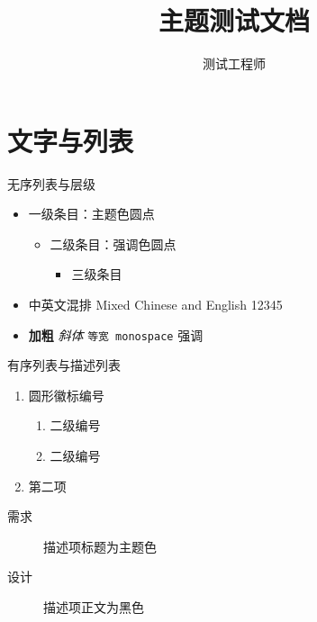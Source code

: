 \usepackage{amsmath}
\usepackage{amssymb}
\usepackage{booktabs}
\usepackage{tabularx}
\usepackage{colortbl}
\usepackage[export]{adjustbox}
\usepackage{fontawesome5}
\usepackage{marvosym}

\title{主题测试文档}
\author{测试工程师}



\begin{frame}[plain]
  \titlepage
\end{frame}

\section{文字与列表}

\begin{frame}{无序列表与层级}
  \begin{itemize}
    \item 一级条目：主题色圆点
      \begin{itemize}
        \item 二级条目：强调色圆点
          \begin{itemize}
            \item 三级条目
          \end{itemize}
      \end{itemize}
    \item 中英文混排 Mixed Chinese and English 12345
    \item \textbf{加粗} \textit{斜体} \texttt{等宽 monospace} \alert{强调}
  \end{itemize}
\end{frame}

\begin{frame}{有序列表与描述列表}
  \begin{enumerate}
    \item 圆形徽标编号
      \begin{enumerate}
        \item 二级编号
        \item 二级编号
      \end{enumerate}
    \item 第二项
  \end{enumerate}
  \begin{description}
    \item[需求] 描述项标题为主题色
    \item[设计] 描述项正文为黑色
  \end{description}
\end{frame}


